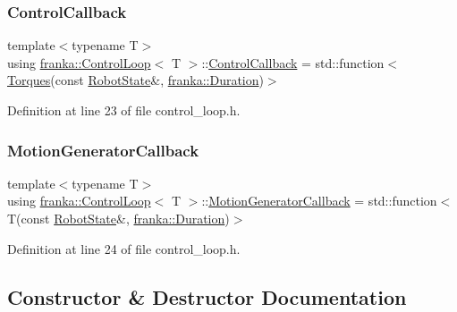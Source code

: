 \subsubsection{\texorpdfstring{Control\+Callback}{ControlCallback}}
{\footnotesize\ttfamily template$<$typename T$>$ \\
using \hyperlink{classfranka_1_1ControlLoop}{franka\+::\+Control\+Loop}$<$ T $>$\+::\hyperlink{classfranka_1_1ControlLoop_a1b050245c6f2795d491899440f95cec3}{Control\+Callback} =  std\+::function$<$\hyperlink{classfranka_1_1Torques}{Torques}(const \hyperlink{structfranka_1_1RobotState}{Robot\+State}\&, \hyperlink{classfranka_1_1Duration}{franka\+::\+Duration})$>$}



Definition at line 23 of file control\+\_\+loop.\+h.

\mbox{\label{classfranka_1_1ControlLoop_a23624d5a86fe2b206986af4757ba1822}} 
\subsubsection{\texorpdfstring{Motion\+Generator\+Callback}{MotionGeneratorCallback}}
{\footnotesize\ttfamily template$<$typename T$>$ \\
using \hyperlink{classfranka_1_1ControlLoop}{franka\+::\+Control\+Loop}$<$ T $>$\+::\hyperlink{classfranka_1_1ControlLoop_a23624d5a86fe2b206986af4757ba1822}{Motion\+Generator\+Callback} =  std\+::function$<$T(const \hyperlink{structfranka_1_1RobotState}{Robot\+State}\&, \hyperlink{classfranka_1_1Duration}{franka\+::\+Duration})$>$}



Definition at line 24 of file control\+\_\+loop.\+h.



\subsection{Constructor \& Destructor Documentation}
\mbox{\label{classfranka_1_1ControlLoop_ac98d7227389027af16be738dbe7043c7}} 
